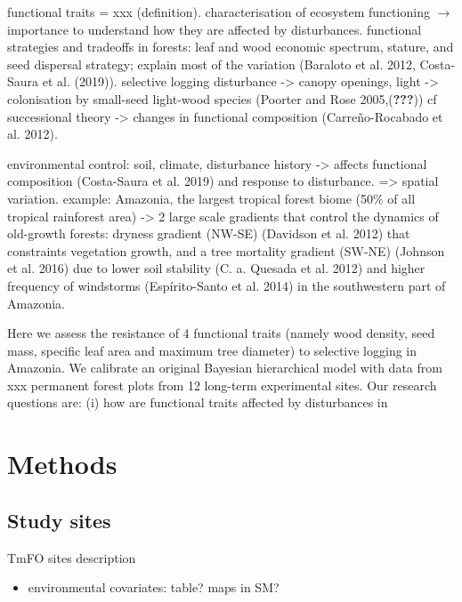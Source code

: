 \documentclass[]{elsarticle} %
\providecommand{\tightlist}{%
  \setlength{\itemsep}{0pt}\setlength{\parskip}{0pt}}
\begin{document}
functional traits = xxx (definition). characterisation of ecosystem
functioning \(\rightarrow\) importance to understand how they are
affected by disturbances. functional strategies and tradeoffs in
forests: leaf and wood economic spectrum, stature, and seed dispersal
strategy; explain most of the variation (Baraloto et al. 2012,
Costa-Saura et al. (2019)). selective logging disturbance
-\textgreater{} canopy openings, light -\textgreater{} colonisation by
small-seed light-wood species (Poorter and Rose 2005,({\textbf{???}}))
cf successional theory -\textgreater{} changes in functional composition
(Carreño-Rocabado et al. 2012).

environmental control: soil, climate, disturbance history
-\textgreater{} affects functional composition (Costa-Saura et al. 2019)
and response to disturbance. =\textgreater{} spatial variation. example:
Amazonia, the largest tropical forest biome (50\% of all tropical
rainforest area) -\textgreater{} 2 large scale gradients that control
the dynamics of old-growth forests: dryness gradient (NW-SE) (Davidson
et al. 2012) that constraints vegetation growth, and a tree mortality
gradient (SW-NE) (Johnson et al. 2016) due to lower soil stability (C.
a. Quesada et al. 2012) and higher frequency of windstorms
(Espírito-Santo et al. 2014) in the southwestern part of Amazonia.

Here we assess the resistance of 4 functional traits (namely wood
density, seed mass, specific leaf area and maximum tree diameter) to
selective logging in Amazonia. We calibrate an original Bayesian
hierarchical model with data from xxx permanent forest plots from 12
long-term experimental sites. Our research questions are: (i) how are
functional traits affected by disturbances in

\section{Methods}\label{methods}

\subsection{Study sites}\label{study-sites}

TmFO sites description

\begin{itemize}
\tightlist
\item
  environmental covariates: table? maps in SM?
\end{itemize}
\end{document}
